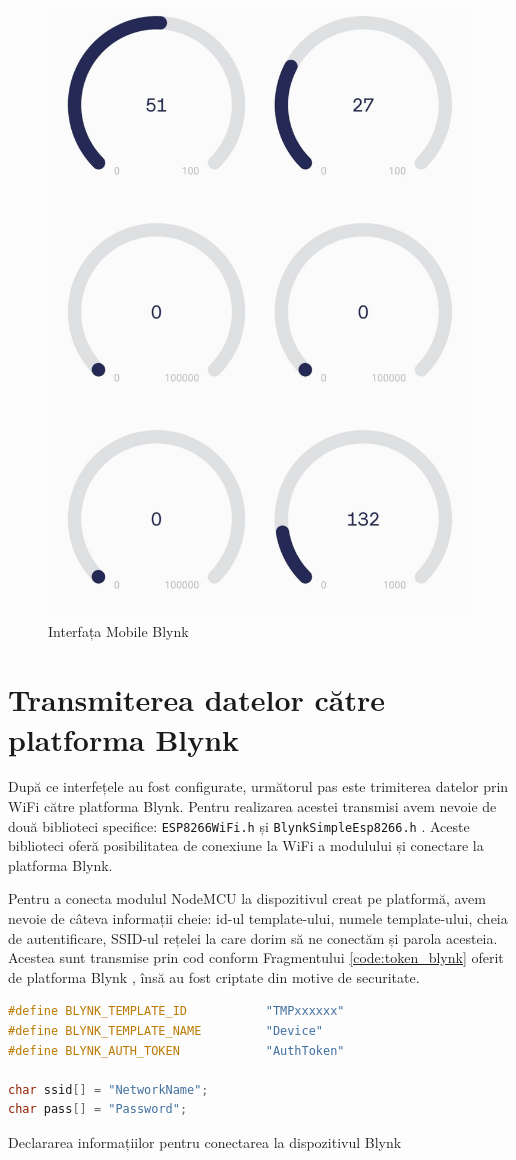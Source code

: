 \begin{figure}[H]
\includegraphics[width=0.4\linewidth]{bachelors_ro/images/interfata_blynk_mobile.jpg}
\caption{Interfața Mobile Blynk\cite{templ_blynk}}
\label{fig:interfata_blynk_mobile}
\end{figure}

\section{Transmiterea datelor către platforma Blynk}
După ce interfețele au fost configurate, următorul pas este trimiterea datelor prin WiFi către platforma Blynk. Pentru realizarea acestei transmisi avem nevoie de două biblioteci specifice: \texttt{ESP8266WiFi.h} \cite{lib_esp} și \texttt{BlynkSimpleEsp8266.h} \cite{lib_blynk}. Aceste biblioteci oferă posibilitatea de conexiune la WiFi a modulului și conectare la platforma Blynk.

Pentru a conecta modulul NodeMCU la dispozitivul creat pe platformă, avem nevoie de câteva informații cheie: id-ul template-ului, numele template-ului, cheia de autentificare, SSID-ul rețelei la care dorim să ne conectăm și parola acesteia. Acestea sunt transmise prin cod conform Fragmentului \ref{code:token_blynk} oferit de platforma Blynk \cite{blynk_browser}, însă au fost criptate din motive de securitate.

\begin{code}[H]
\begin{lstlisting}[language=C++]
#define BLYNK_TEMPLATE_ID           "TMPxxxxxx"
#define BLYNK_TEMPLATE_NAME         "Device"
#define BLYNK_AUTH_TOKEN            "AuthToken"

char ssid[] = "NetworkName";
char pass[] = "Password";
\end{lstlisting}
\caption{Declararea informațiilor pentru conectarea la dispozitivul Blynk \cite{blynk_browser}}
\label{code:token_blynk}
\end{code}

